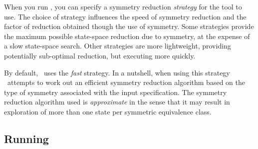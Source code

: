 When you run \topspin, you can specify a symmetry reduction
\emph{strategy} for the tool to use.  The choice of strategy
influences the speed of symmetry reduction and the factor of
reduction obtained though the use of symmetry.  Some strategies
provide the maximum possible state-space reduction due to symmetry,
at the expense of a slow state-space search.  Other strategies are
more lightweight, providing potentially sub-optimal reduction, but
executing more quickly.

By default, \topspin\ uses the \emph{fast} strategy.  In a nutshell,
when using this strategy \topspin\ attempts to work out an efficient
symmetry reduction algorithm based on the type of symmetry
associated with the input specification.  The symmetry reduction
algorithm used is \emph{approximate} in the sense that it may result
in exploration of more than one state per symmetric equivalence
class.

\subsection{Running \protect\topspin}

